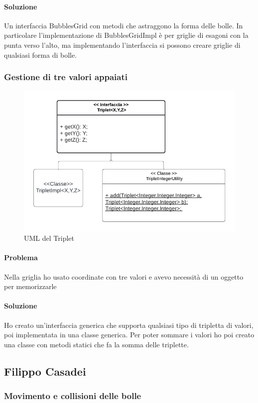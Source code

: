 \documentclass[a4paper,12pt]{report}
\begin{document}
\paragraph{Soluzione} Un interfaccia BubblesGrid con metodi che astraggono la forma delle bolle. 
In particolare l'implementazione di BubblesGridImpl è per griglie di esagoni con la punta verso l'alto, 
ma implementando l'interfaccia si possono creare griglie di qualsiasi forma di bolle.

\subsubsection{Gestione di tre valori appaiati}

\begin{figure}[H]
	\centering{}
	\includegraphics[width=.7\textwidth]{img/triplet.pdf}
	\caption{UML del Triplet}
\end{figure}

\paragraph{Problema} Nella griglia ho usato coordinate con tre valori e avevo necessità di un oggetto per memorizzarle

\paragraph{Soluzione} Ho creato un'interfaccia generica che supporta qualsiasi tipo di tripletta di valori, poi implementata in una classe generica.
Per poter sommare i valori ho poi creato una classe con metodi statici che fa la somma delle triplette.

\subsection{Filippo Casadei}
\subsubsection{Movimento e collisioni delle bolle}
\end{document}
